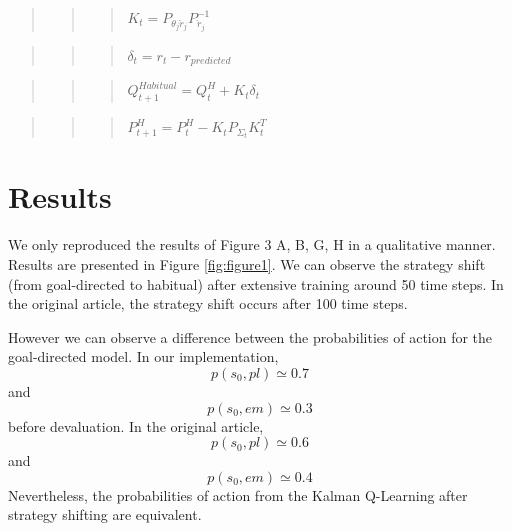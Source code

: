 \documentclass[10pt,a4paper,onecolumn]{article}
\begin{document}
\begin{quote}
\begin{quote}
\begin{quote}
\(K_t = P_{\theta_j \check{r}_j} P_{\check{r}_j}^{-1}\)
\end{quote}
\end{quote}
\end{quote}

\begin{quote}
\begin{quote}
\begin{quote}
\(\delta_t = r_t - r_{predicted}\)
\end{quote}
\end{quote}
\end{quote}

\begin{quote}
\begin{quote}
\begin{quote}
\(Q_{t+1}^{Habitual} = Q_{t}^{H} + K_t \delta_t\)
\end{quote}
\end{quote}
\end{quote}

\begin{quote}
\begin{quote}
\begin{quote}
\(P_{t+1}^{H} = P_{t}^{H} - K_t P_{\Sigma_t} K_t^T\)
\end{quote}
\end{quote}
\end{quote}

\section{Results}\label{results}

We only reproduced the results of Figure 3 A, B, G, H in a qualitative
manner. Results are presented in Figure \ref{fig:figure1}. We can
observe the strategy shift (from goal-directed to habitual) after
extensive training around 50 time steps. In the original article, the
strategy shift occurs after 100 time steps.

However we can observe a difference between the probabilities of action
for the goal-directed model. In our implementation,
\[p(s_0, pl) \simeq 0.7\] and \[p(s_0, em) \simeq 0.3\] before
devaluation. In the original article, \[p(s_0, pl) \simeq 0.6\] and
\[p(s_0, em) \simeq 0.4\] Nevertheless, the probabilities of action from
the Kalman Q-Learning after strategy shifting are equivalent.
\end{document}
